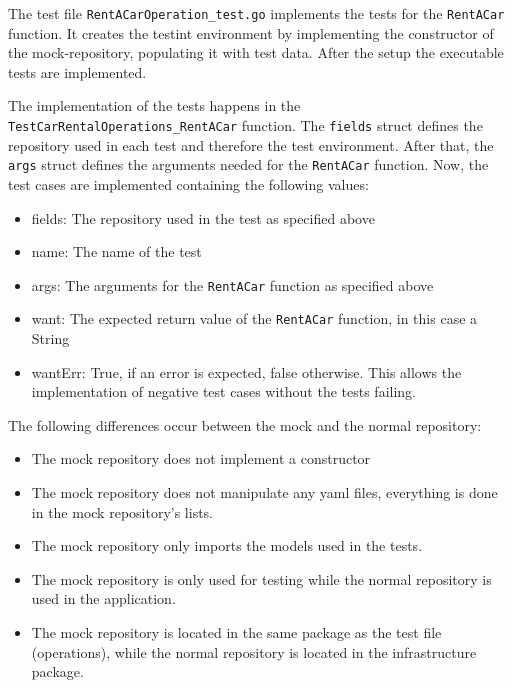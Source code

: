 The test file \texttt{RentACarOperation\_test.go} implements the tests for the \texttt{RentACar} function.
It creates the testint environment by implementing the constructor of the mock-repository, populating it with test data.
After the setup the executable tests are implemented.

The implementation of the tests happens in the \texttt{TestCarRentalOperations\_RentACar} function.
The \texttt{fields} struct defines the repository used in each test and therefore the test environment.
After that, the \texttt{args} struct defines the arguments needed for the \texttt{RentACar} function.
Now, the test cases are implemented containing the following values:
\begin{itemize}
      \item fields: The repository used in the test as specified above
      \item name: The name of the test
      \item args: The arguments for the \texttt{RentACar} function as specified above
      \item want: The expected return value of the \texttt{RentACar} function, in this case a String 
      \item wantErr: True, if an error is expected, false otherwise. 
            This allows the implementation of negative test cases without the tests failing.
\end{itemize}

The following differences occur between the mock and the normal repository:
\begin{itemize}
      \item The mock repository does not implement a constructor
      \item The mock repository does not manipulate any yaml files, everything is done in the mock repository's lists.
      \item The mock repository only imports the models used in the tests.
      \item The mock repository is only used for testing while the normal repository is used in the application.
      \item The mock repository is located in the same package as the test file (operations), while the normal repository is located in the infrastructure package.
\end{itemize}


